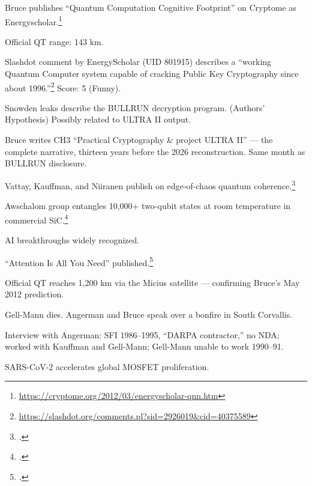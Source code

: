 \begin{description}[style=nextline, leftmargin=3.5cm, labelwidth=3cm]
\item[Mar 2012] Bruce publishes ``Quantum Computation Cognitive Footprint'' on Cryptome as Energyscholar.\footnote{\url{https://cryptome.org/2012/03/energyscholar-qnn.htm}}

\item[2012] Official QT range: 143 km.

\item[Jun 2012] Slashdot comment by EnergyScholar (UID 801915) describes a ``working Quantum Computer system capable of cracking Public Key Cryptography since about 1996.''\footnote{\url{https://slashdot.org/comments.pl?sid=2926019&cid=40375589}} Score: 5 (Funny).

\item[2013] Snowden leaks describe the BULLRUN decryption program. (Authors' Hypothesis) Possibly related to ULTRA II output.

\item[Sep 2013] Bruce writes CH3 ``Practical Cryptography \& project ULTRA II'' --- the complete narrative, thirteen years before the 2026 reconstruction. Same month as BULLRUN disclosure.

\item[2014] Vattay, Kauffman, and Niiranen publish on edge-of-chaos quantum coherence.\footcite{vattay2014}

\item[2015] Awschalom group entangles 10{,}000+ two-qubit states at room temperature in commercial SiC.\footcite{klimov2015}

\item[2016] AI breakthroughs widely recognized.

\item[Jun 2017] ``Attention Is All You Need'' published.\footcite{vaswani2017}

\item[2017] Official QT reaches 1{,}200 km via the Micius satellite --- confirming Bruce's May 2012 prediction.

\item[May 2019] Gell-Mann dies. Angerman and Bruce speak over a bonfire in South Corvallis.

\item[Jun 2019] Interview with Angerman: SFI 1986--1995, ``DARPA contractor,'' no NDA; worked with Kauffman and Gell-Mann; Gell-Mann unable to work 1990--91.

\item[2020] SARS-CoV-2 accelerates global MOSFET proliferation.


\end{description}
